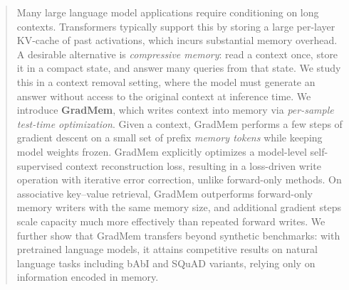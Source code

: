 \documentclass{article}
\theoremstyle{plain}
\theoremstyle{definition}
\theoremstyle{remark}
\begin{document}
\printAffiliationsAndNotice{}  %

\begin{abstract}

Many large language model applications require conditioning on long contexts.
Transformers typically support this by storing a large per-layer KV-cache of past activations, which incurs substantial memory overhead.
A desirable alternative is \emph{compressive memory}: read a context once, store it in a compact state, and answer many queries from that state.
We study this in a context removal setting, where the model must generate an answer without access to the original context at inference time.
We introduce \textbf{GradMem}, which writes context into memory via \emph{per-sample test-time optimization}.
Given a context, GradMem performs a few steps of gradient descent on a small set of prefix \emph{memory tokens} while keeping model weights frozen.
GradMem explicitly optimizes a model-level self-supervised context reconstruction loss, resulting in a loss-driven write operation with iterative error correction, unlike forward-only methods.
On associative key--value retrieval, GradMem outperforms forward-only memory writers with the same memory size, and additional gradient steps scale capacity much more effectively than repeated forward writes.
We further show that GradMem transfers beyond synthetic benchmarks: with pretrained language models, it attains competitive results on natural language tasks including bAbI and SQuAD variants, relying only on information encoded in memory.



\end{abstract}
\end{document}
